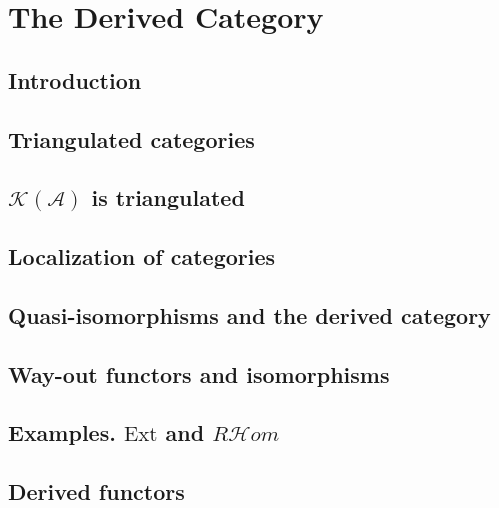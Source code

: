 \chapter{The Derived Category}
\section{Introduction}
\section{Triangulated categories}
\section{$\mathcal{K}(\mathcal{A})$ is triangulated}
\section{Localization of categories}
\section{Quasi-isomorphisms and the derived category}
\section{Way-out functors and isomorphisms}
\section{Examples. $\mathrm{Ext}$ and $R\mathcal{H}\mathit{om}$}
\section{Derived functors}

